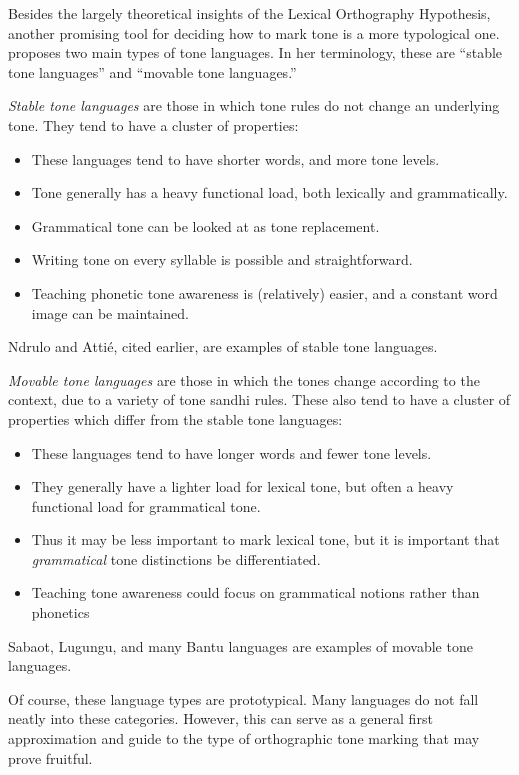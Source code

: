 \documentclass[output=paper]{langscibook}
\begin{document}
Besides the largely theoretical insights of the Lexical Orthography Hypothesis, another promising tool for deciding how to mark tone is a more typological one. \citet{Kutsch2014} proposes two main types of tone languages. In her terminology, these are “stable tone languages” and “movable tone languages.”

\textit{Stable tone languages} are those in which tone rules do not change an underlying tone. They tend to have a cluster of properties:

\begin{itemize}
    \item These languages tend to have shorter words, and more tone levels. 
    \item Tone generally has a heavy functional load, both lexically and grammatically. 
    \item Grammatical tone can be looked at as tone replacement. 
    \item Writing tone on every syllable is possible and straightforward. 
    \item Teaching phonetic tone awareness is (relatively) easier, and a constant word image can be maintained.
\end{itemize}
Ndrulo and Attié, cited earlier, are examples of stable tone languages. 

\textit{Movable tone languages} are those in which the tones change according to the context, due to a variety of tone sandhi rules. These also tend to have a cluster of properties which differ from the stable tone languages:

\begin{itemize}
    \item These languages tend to have longer words and fewer tone levels. 
    \item They generally have a lighter load for lexical tone, but often a heavy functional load for grammatical tone. 
    \item Thus it may be less important to mark lexical tone, but it is important that \textit{grammatical} tone distinctions be differentiated.
    \item Teaching tone awareness could focus on grammatical notions rather than phonetics 
\end{itemize}

Sabaot, Lugungu, and many Bantu languages are examples of movable tone languages. 

Of course, these language types are prototypical. Many languages do not fall neatly into these categories. However, this can serve as a general first approximation and guide to the type of orthographic tone marking that may prove fruitful.
\end{document}
